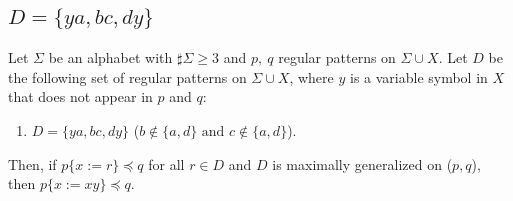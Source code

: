 
\subsection{$D = \{ ya, bc, dy \}$}\label{subsec:d3a}

\newcommand{\TheConditionA}{$b \not\in \{a,d\} \mbox{~and~} c \not\in \{a,d\}$}
\newcommand{\TheConditionB}{$b = a,~b \not= d, \mbox{~and~} c \not\in \{a,d\}$}
\newcommand{\TheConditionBsub}{$c \not\in \{a,d\}$}
\newcommand{\TheConditionC}{$b \not\in \{a, d\},~c \not= a, \mbox{~and~} c = d$}

\begin{lem}\label{lem:addpart}
  Let $\Sigma$ be an alphabet with $\sharp\Sigma \ge 3$ and $p,~q$ regular patterns on $\Sigma\cup X$.
  Let $D$ be the following set of regular patterns on $\Sigma\cup X$, where $y$ is a variable symbol in $X$ that does not appear in $p$ and $q$:
  \begin{enumerate}
  \item[] $D = \{ ya, bc, dy \}$ (\TheConditionA).
  \end{enumerate}
  Then, if $p \{ x := r \} \preceq q$ for all $r \in D$ and $D$ is maximally generalized on ($p,q$), then $p \{ x := xy \} \preceq q$.
\end{lem}


